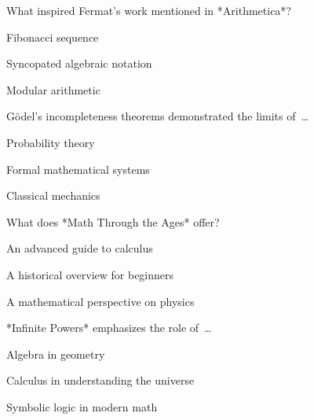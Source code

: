 \begin{enhancedmcq}{What inspired Fermat's work mentioned in *Arithmetica*?}
\item Fibonacci sequence
\item Syncopated algebraic notation
\item Modular arithmetic

\end{enhancedmcq}
\begin{enhancedmcq}{Gödel's incompleteness theorems demonstrated the limits of …}
\item Probability theory
\item Formal mathematical systems
\item Classical mechanics

\end{enhancedmcq}
\begin{enhancedmcq}{What does *Math Through the Ages* offer?}
\item An advanced guide to calculus
\item A historical overview for beginners
\item A mathematical perspective on physics

\end{enhancedmcq}
\begin{enhancedmcq}{*Infinite Powers* emphasizes the role of …}
\item Algebra in geometry
\item Calculus in understanding the universe
\item Symbolic logic in modern math
\end{enhancedmcq}